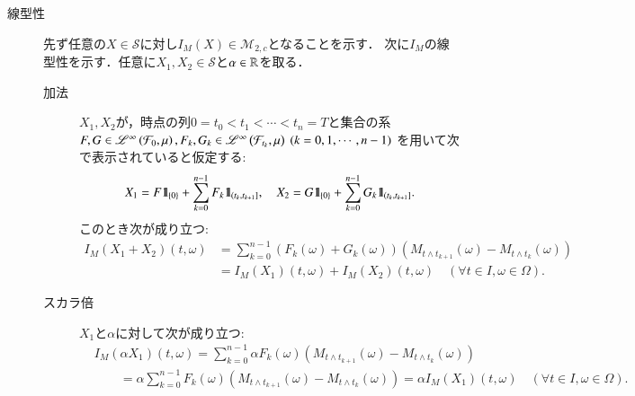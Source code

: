 	\begin{prf}\mbox{}
		\begin{description}
			\item[線型性]
				先ず任意の$X \in \mathcal{S}$に対し$I_M(X) \in \mathcal{M}_{2,c}$となることを示す．
				次に$I_M$の線型性を示す．任意に$X_1,X_2 \in \mathcal{S}$と$\alpha \in \mathbb{R}$を取る．
				\begin{description}
					\item[加法]
						$X_1,X_2$が，時点の列$0=t_0<t_1<\cdots<t_n = T$と集合の系$F,G \in \mathscr{L}^{\infty} \left(\mathcal{F}_0,\mu\right),
						F_k,G_k \in \mathscr{L}^{\infty} \left(\mathcal{F}_{t_k},\mu\right)\ (k=0,1,\cdots,n-1)$
						を用いて次で表示されていると仮定する:
						\begin{align}
							X_1 = F \mbox{1}\hspace{-0.25em}\mbox{l}_{\{0\}} + \sum_{k=0}^{n-1} F_k \mbox{1}\hspace{-0.25em}\mbox{l}_{\left(t_k,t_{k+1}\right]},
							\quad X_2 = G \mbox{1}\hspace{-0.25em}\mbox{l}_{\{0\}} + \sum_{k=0}^{n-1} G_k \mbox{1}\hspace{-0.25em}\mbox{l}_{\left(t_k,t_{k+1}\right]}.
						\end{align}
						このとき次が成り立つ:
						\begin{align}
							I_M(X_1 + X_2)(t,\omega)
							&= \sum_{k=0}^{n-1} \left( F_k(\omega) + G_k(\omega) \right) \left( M_{t \wedge t_{k+1}}(\omega) - M_{t \wedge t_k}(\omega) \right) \\
							&= I_M(X_1)(t,\omega) + I_M(X_2)(t,\omega)
							\quad (\forall t \in I,\omega \in \Omega).
						\end{align}
					\item[スカラ倍]
						$X_1$と$\alpha$に対して次が成り立つ:
						\begin{align}
							&I_M(\alpha X_1)(t,\omega)
							= \sum_{k=0}^{n-1} \alpha F_k(\omega) \left(M_{t \wedge t_{k+1}}(\omega) - M_{t \wedge t_k}(\omega)\right) \\
							&\qquad= \alpha \sum_{k=0}^{n-1} F_k(\omega) \left(M_{t \wedge t_{k+1}}(\omega) - M_{t \wedge t_k}(\omega)\right)
							= \alpha I_M(X_1)(t,\omega)
							\quad (\forall t \in I,\omega \in \Omega).
						\end{align}
				\end{description}
				

\end{description}
\end{prf}
